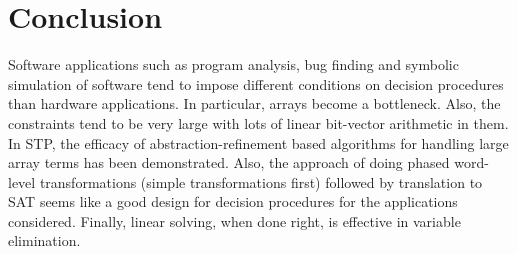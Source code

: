 \section{Conclusion}
Software applications such as program analysis, bug finding and
symbolic simulation of software tend to impose different conditions on
decision procedures than hardware applications. In particular, arrays
become a bottleneck. Also, the constraints tend to be very large with
lots of linear bit-vector arithmetic in them. In STP, the efficacy of
abstraction-refinement based algorithms for handling large array terms
has been demonstrated. Also, the approach of doing phased word-level
transformations (simple transformations first) followed by translation
to SAT seems like a good design for decision procedures for the
applications considered. Finally, linear solving, when done right, is
effective in variable elimination.

